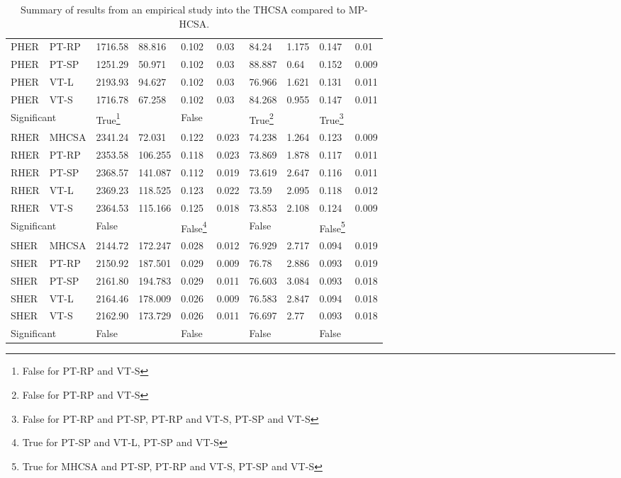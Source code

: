 \begin{table}[H]
\begin{minipage}{\textwidth}
\begin{tabularx}{\textwidth} {llllllllll}
		PHER & PT-RP & 1716.58 & 88.816 & 0.102 & 0.03 & 84.24 & 1.175 & 0.147 & 0.01 \\ 
		PHER & PT-SP & 1251.29 & 50.971 & 0.102 & 0.03 & 88.887 & 0.64 & 0.152 & 0.009 \\ 
		PHER & VT-L & 2193.93 & 94.627 & 0.102 & 0.03 & 76.966 & 1.621 & 0.131 & 0.011 \\ 
		PHER & VT-S & 1716.78 & 67.258 & 0.102 & 0.03 & 84.268 & 0.955 & 0.147 & 0.011 \\ 
		\multicolumn{2}{l}{Significant} & True\footnote{False for PT-RP and VT-S} & & False & & True\footnote{False for PT-RP and VT-S} & & True\footnote{False for PT-RP and PT-SP, PT-RP and VT-S, PT-SP and VT-S} & \\ 
		\midrule
		RHER & MHCSA & 2341.24 & 72.031 & 0.122 & 0.023 & 74.238 & 1.264 & 0.123 & 0.009 \\ 
		RHER & PT-RP & 2353.58 & 106.255 & 0.118 & 0.023 & 73.869 & 1.878 & 0.117 & 0.011 \\ 
		RHER & PT-SP & 2368.57 & 141.087 & 0.112 & 0.019 & 73.619 & 2.647 & 0.116 & 0.011 \\ 
		RHER & VT-L & 2369.23 & 118.525 & 0.123 & 0.022 & 73.59 & 2.095 & 0.118 & 0.012 \\ 
		RHER & VT-S & 2364.53 & 115.166 & 0.125 & 0.018 & 73.853 & 2.108 & 0.124 & 0.009 \\ 
		\multicolumn{2}{l}{Significant} & False & & False\footnote{True for PT-SP and VT-L, PT-SP and VT-S} & & False & & False\footnote{True for MHCSA and PT-SP, PT-RP and VT-S, PT-SP and VT-S} & \\ 
		\midrule
		SHER & MHCSA & 2144.72 & 172.247 & 0.028 & 0.012 & 76.929 & 2.717 & 0.094 & 0.019 \\ 
		SHER & PT-RP & 2150.92 & 187.501 & 0.029 & 0.009 & 76.78 & 2.886 & 0.093 & 0.019 \\ 
		SHER & PT-SP & 2161.80 & 194.783 & 0.029 & 0.011 & 76.603 & 3.084 & 0.093 & 0.018 \\ 
		SHER & VT-L & 2164.46 & 178.009 & 0.026 & 0.009 & 76.583 & 2.847 & 0.094 & 0.018 \\ 
		SHER & VT-S & 2162.90 & 173.729 & 0.026 & 0.011 & 76.697 & 2.77 & 0.093 & 0.018 \\ 
		\multicolumn{2}{l}{Significant} & False & & False & & False & & False & \\ 
		\bottomrule
		\end{tabularx}	
	\end{minipage}
	\caption{Summary of results from an empirical study into the THCSA compared to MP-HCSA.}
	\label{tab:hosts:thcsa:results}
\end{table}


